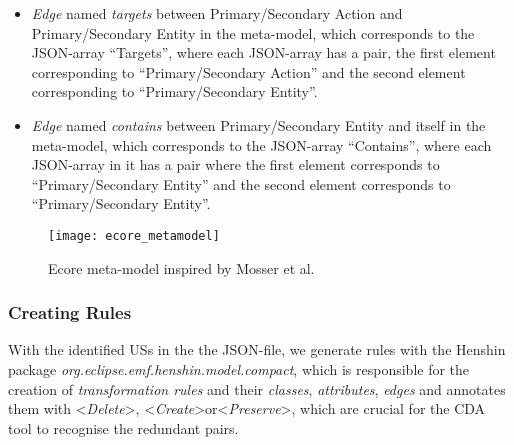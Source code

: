 \begin{itemize}
	\item \textit{Edge} named \textit{targets} between Primary/Secondary Action and Primary/Secondary Entity in the meta-model, which corresponds to the JSON-array \enquote{Targets}, where each JSON-array has a pair, the first element corresponding to \enquote{Primary/Secondary Action} and the second element corresponding to \enquote{Primary/Secondary Entity}.
	\item \textit{Edge} named \textit{contains} between Primary/Secondary Entity and itself in the meta-model, which corresponds to the JSON-array \enquote{Contains}, where each JSON-array in it has a pair where the first element corresponds to \enquote{Primary/Secondary Entity} and the second element corresponds to \enquote{Primary/Secondary Entity}.
\end{itemize}

\begin{figure}[h]
	\center
	\texttt{[image: ecore\_metamodel]}
	\caption{Ecore meta-model inspired by Mosser et al. \cite{mosser2022modelling}}\label{fig:ecore_meta_model}
\end{figure} 
\subsubsection*{Creating Rules}\label{workflow_rule_creator}
With the identified USs in the the JSON-file, we generate rules with the Henshin package \textit{org.eclipse.emf.henshin.model.compact}, which is responsible for the creation of \textit{transformation rules} and their \textit{classes}, \textit{attributes}, \textit{edges} and annotates them with \textless\emph{Delete}\textgreater, \textless\textit{Create}\textgreater or\textless\textit{Preserve}\textgreater, which are crucial for the CDA tool to recognise the redundant pairs.
 
